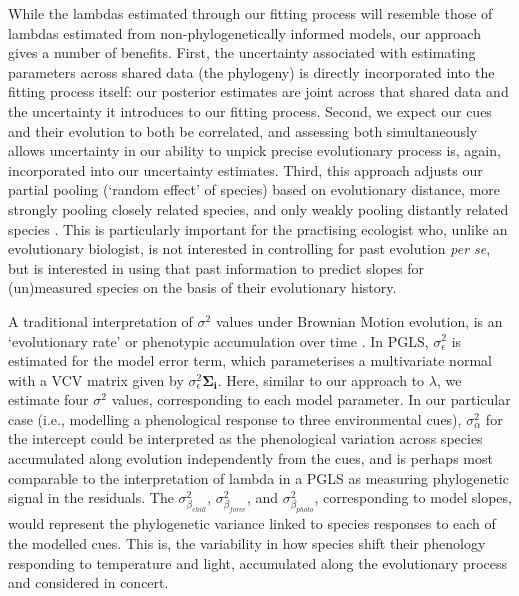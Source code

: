 \documentclass[11pt]{article}
\begin{document}
While the lambdas estimated through our fitting process will resemble those of lambdas estimated from non-phylogenetically informed models, our approach gives a number of benefits. First, the uncertainty associated with estimating parameters across shared data (the phylogeny) is directly incorporated into the fitting process itself: our posterior estimates are joint across that shared data and the uncertainty it introduces to our fitting process. Second, we expect our cues and their evolution to both be correlated, and assessing both simultaneously allows uncertainty in our ability to unpick precise evolutionary process is, again, incorporated into our uncertainty estimates. Third, this approach adjusts our partial pooling (`random effect' of species) based on evolutionary distance, more strongly pooling closely related species, and only weakly pooling distantly related species \citep[see Gaussian process models in][]{BDA}. This is particularly important for the practising ecologist who, unlike an evolutionary biologist, is not interested in controlling for past evolution \emph{per se}, but is interested in using that past information to predict slopes for (un)measured species on the basis of their evolutionary history.

A traditional interpretation of $\sigma^2$ values under Brownian Motion evolution, is an `evolutionary rate' or phenotypic accumulation over time \citep{revell2008phylogenetic}. In PGLS, $\sigma_\epsilon^2$ is estimated for the model error term, which parameterises a multivariate normal with a VCV matrix given by $\sigma_\epsilon^2$$\boldsymbol{\Sigma_i}$. Here, similar to our approach to $\lambda$, we estimate four $\sigma^2$ values, corresponding to each model parameter. In our particular case (i.e., modelling a phenological response to three environmental cues), $\sigma_\alpha^2$ for the intercept could be interpreted as the phenological variation across species accumulated along evolution independently from the cues, and is perhaps most comparable to the interpretation of lambda in a PGLS as measuring phylogenetic signal in the residuals. The $\sigma_{\beta_{chill}}^2$, $\sigma_{\beta_{force}}^2$, and $\sigma_{\beta_{photo}}^2$, corresponding to model slopes, would represent the phylogenetic variance linked to species responses to each of the modelled cues. This is, the variability in how species shift their phenology responding to temperature and light, accumulated along the evolutionary process and considered in concert. 
\end{document}
